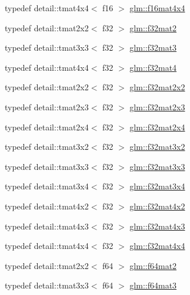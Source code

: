 \begin{DoxyCompactItemize}
\item 
typedef detail\+::tmat4x4$<$ f16 $>$ \hyperlink{group__gtc__type__precision_gaf9b9286a90e95701746631e00c08697a}{glm\+::f16mat4x4}
\item 
typedef detail\+::tmat2x2$<$ f32 $>$ \hyperlink{group__gtc__type__precision_ga82ecea513745584fb481d18fc9fa5e0a}{glm\+::f32mat2}
\item 
typedef detail\+::tmat3x3$<$ f32 $>$ \hyperlink{group__gtc__type__precision_gadc036a0da6d6b14996ece8884896a0e6}{glm\+::f32mat3}
\item 
typedef detail\+::tmat4x4$<$ f32 $>$ \hyperlink{group__gtc__type__precision_gaf7b538eba9a2dd812c39ac7145e7cd93}{glm\+::f32mat4}
\item 
typedef detail\+::tmat2x2$<$ f32 $>$ \hyperlink{group__gtc__type__precision_ga0cd7f055e4070140afba92b7fbff1e04}{glm\+::f32mat2x2}
\item 
typedef detail\+::tmat2x3$<$ f32 $>$ \hyperlink{group__gtc__type__precision_gae5592c8cdb8c7d7985d06af7d774e261}{glm\+::f32mat2x3}
\item 
typedef detail\+::tmat2x4$<$ f32 $>$ \hyperlink{group__gtc__type__precision_gaf86a2c845d7ced1b3c0c22a0b5b7e3e8}{glm\+::f32mat2x4}
\item 
typedef detail\+::tmat3x2$<$ f32 $>$ \hyperlink{group__gtc__type__precision_gadf01336f427b8b6918bcad610cfc2fd6}{glm\+::f32mat3x2}
\item 
typedef detail\+::tmat3x3$<$ f32 $>$ \hyperlink{group__gtc__type__precision_ga5784742e2a453a8df85e7453a1386189}{glm\+::f32mat3x3}
\item 
typedef detail\+::tmat3x4$<$ f32 $>$ \hyperlink{group__gtc__type__precision_ga6ca7c9195aeb5fdc8a6b8dcba6ce4ab3}{glm\+::f32mat3x4}
\item 
typedef detail\+::tmat4x2$<$ f32 $>$ \hyperlink{group__gtc__type__precision_ga0049d706c1dc65ea5212a7b0ce64b0f0}{glm\+::f32mat4x2}
\item 
typedef detail\+::tmat4x3$<$ f32 $>$ \hyperlink{group__gtc__type__precision_ga0b80103fc9c41a559c616e3f84dc570f}{glm\+::f32mat4x3}
\item 
typedef detail\+::tmat4x4$<$ f32 $>$ \hyperlink{group__gtc__type__precision_gaffefd599ebe609080b8e999aa8df7f83}{glm\+::f32mat4x4}
\item 
typedef detail\+::tmat2x2$<$ f64 $>$ \hyperlink{group__gtc__type__precision_ga9df0911951345cd94f86e7d3895e6941}{glm\+::f64mat2}
\item 
typedef detail\+::tmat3x3$<$ f64 $>$ \hyperlink{group__gtc__type__precision_ga1a05ac0a6e87b279e77d877968f391bc}{glm\+::f64mat3}

\end{DoxyCompactItemize}
